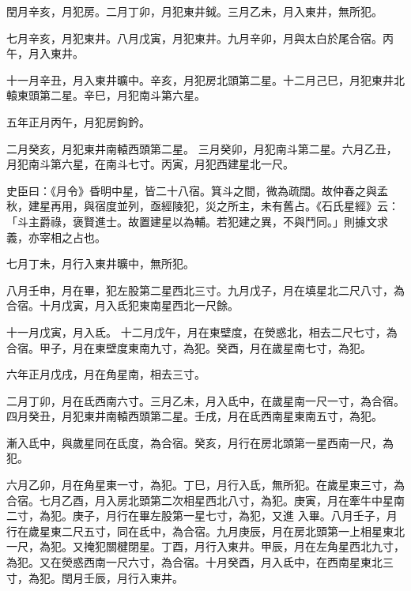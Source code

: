 \begin{pinyinscope}
 閏月辛亥，月犯房。二月丁卯，月犯東井鉞。三月乙未，月入東井，無所犯。



 七月辛亥，月犯東井。八月戊寅，月犯東井。九月辛卯，月與太白於尾合宿。丙午，月入東井。



 十一月辛丑，月入東井曠中。辛亥，月犯房北頭第二星。十二月己巳，月犯東井北轅東頭第二星。辛巳，月犯南斗第六星。



 五年正月丙午，月犯房鉤鈐。



 二月癸亥，月犯東井南轅西頭第二星。
 三月癸卯，月犯南斗第二星。六月乙丑，月犯南斗第六星，在南斗七寸。丙寅，月犯西建星北一尺。



 史臣曰：《月令》昏明中星，皆二十八宿。箕斗之間，微為疏闊。故仲春之與孟秋，建星再用，與宿度並列，亟經陵犯，災之所主，未有舊占。《石氏星經》云：「斗主爵祿，褒賢進士。故置建星以為輔。若犯建之異，不與鬥同。」則據文求義，亦宰相之占也。



 七月丁未，月行入東井曠中，無所犯。



 八月壬申，月在畢，犯左股第二星西北三寸。九月戊子，月在填星北二尺八寸，為合宿。十月戊寅，月入氐犯東南星西北一尺餘。



 十一月戊寅，月入氐。
 十二月戊午，月在東壁度，在熒惑北，相去二尺七寸，為合宿。甲子，月在東壁度東南九寸，為犯。癸酉，月在歲星南七寸，為犯。



 六年正月戊戌，月在角星南，相去三寸。



 二月丁卯，月在氐西南六寸。三月乙未，月入氐中，在歲星南一尺一寸，為合宿。四月癸丑，月犯東井南轅西頭第二星。壬戌，月在氐西南星東南五寸，為犯。



 漸入氐中，與歲星同在氐度，為合宿。癸亥，月行在房北頭第一星西南一尺，為犯。



 六月乙卯，月在角星東一寸，為犯。丁巳，月行入氐，無所犯。在歲星東三寸，為合宿。七月乙酉，月入房北頭第二次相星西北八寸，為犯。庚寅，月在牽牛中星南二寸，為犯。庚子，月行在畢左股第一星七寸，為犯，又進
 入畢。八月壬子，月行在歲星東二尺五寸，同在氐中，為合宿。九月庚辰，月在房北頭第一上相星東北一尺，為犯。又掩犯關楗閉星。丁酉，月行入東井。甲辰，月在左角星西北九寸，為犯。又在熒惑西南一尺六寸，為合宿。十月癸酉，月入氐中，在西南星東北三寸，為犯。閏月壬辰，月行入東井。




\end{pinyinscope}
